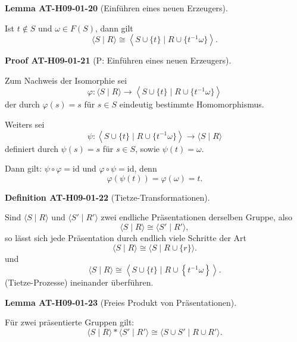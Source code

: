\documentclass[10pt, letterpaper]{article}
\newcommand{\CustomHeading}[3]{%
  \par\medskip\noindent%
  \textbf{#1 #2} \textnormal{(#3)}.\enskip%
}
\newenvironment{DEF}[2]{\begin{unitbox}\CustomHeading{Definition}{#1}{#2}}{\end{unitbox}}
\newenvironment{LEM}[2]{\begin{unitbox}\CustomHeading{Lemma}{#1}{#2}}{\end{unitbox}}
\newenvironment{PROOF}[2]{\begin{unitbox}\CustomHeading{Proof}{#1}{#2}}{\end{unitbox}}
\begin{document}

\begin{LEM}{AT-H09-01-20}{Einführen eines neuen Erzeugers}
Ist $t \notin S$ und $\omega \in F(S)$, dann gilt
\[
\langle S \mid R\rangle \cong \left\langle S \cup \{t\} \mid R \cup \{t^{-1} \omega\} \right\rangle.
\]
\end{LEM}


\begin{PROOF}{AT-H09-01-21}{P: Einführen eines neuen Erzeugers}
Zum Nachweis der Isomorphie sei
\[
\varphi: \langle S \mid R\rangle \to \left\langle S \cup \{t\} \mid R \cup \{t^{-1}\omega\} \right\rangle
\]
der durch $\varphi(s) = s$ für $s \in S$ eindeutig bestimmte Homomorphismus.

Weiters sei
\[
\psi: \left\langle S \cup \{t\} \mid R \cup \{t^{-1}\omega\} \right\rangle \to \langle S \mid R\rangle
\]
definiert durch $\psi(s) = s$ für $s \in S$, sowie $\psi(t) = \omega$.

Dann gilt: $\psi \circ \varphi = \mathrm{id}$ und $\varphi \circ \psi = \mathrm{id}$, denn
\[
\varphi(\psi(t)) = \varphi(\omega) = t.
\]
\end{PROOF}





\begin{DEF}{AT-H09-01-22}{Tietze-Transformationen}
Sind $\langle S \mid R\rangle$ und $\langle S' \mid R'\rangle$ zwei endliche Präsentationen derselben Gruppe, also
\[
\langle S \mid R\rangle \cong \langle S' \mid R'\rangle,
\]
so lässt sich jede Präsentation durch endlich viele Schritte der Art
$$
\langle S \mid R\rangle \cong\langle S \mid R \cup\{r\}\rangle .
$$
und
$$
\langle S \mid R\rangle \cong\left\langle S \cup\{t\} \mid R \cup\left\{t^{-1} \omega\right\}\right\rangle .
$$
(Tietze-Prozesse) ineinander überführen.
\end{DEF}




\begin{LEM}{AT-H09-01-23}{Freies Produkt von Präsentationen}
Für zwei präsentierte Gruppen gilt:
\[
\langle S \mid R\rangle * \langle S' \mid R'\rangle \cong \langle S \cup S' \mid R \cup R'\rangle.
\]
\end{LEM}


\end{document}
